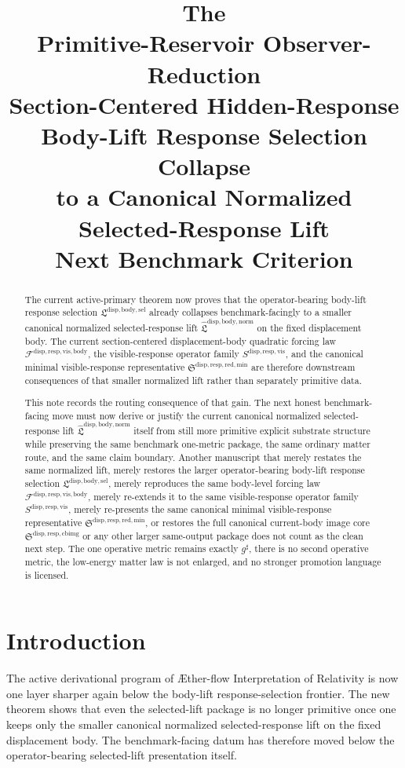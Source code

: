 \documentclass[11pt]{article}
\title{\textbf{The \TheoryName{}}\\[0.4em]
\large Primitive-Reservoir Observer-Reduction\\
\large Section-Centered Hidden-Response\\
\large Body-Lift Response Selection Collapse\\
\large to a Canonical Normalized\\
\large Selected-Response Lift\\
\large Next Benchmark Criterion}
\author{}
\date{}
\newcommand{\Aflow}{\AE{}ther-flow}
\newcommand{\TheoryName}{\Aflow{} Interpretation of Relativity}
\newcommand{\CompletedMetric}{g^{\sharp}}
\newcommand{\LiftSelectionPackage}{\mathfrak L^{\mathrm{disp,body,sel}}}
\newcommand{\NormalizedLiftPackage}{\widehat{\mathfrak L}^{\mathrm{disp,body,norm}}}
\newcommand{\VisibleBodyForcingLaw}{\mathscr F^{\mathrm{disp,resp,vis,body}}}
\newcommand{\VisibleResponseOperator}{S^{\mathrm{disp,resp,vis}}}
\newcommand{\MinimalReducedStructure}{\mathfrak S^{\mathrm{disp,resp,red,min}}}
\newcommand{\CurrentBodyImageCore}{\mathfrak S^{\mathrm{disp,resp,cbimg}}}
\begin{document}
\maketitle

\begin{abstract}
The current active-primary theorem now proves that the operator-bearing body-lift response selection \(\LiftSelectionPackage\) already collapses benchmark-facingly to a smaller canonical normalized selected-response lift \(\NormalizedLiftPackage\) on the fixed displacement body. The current section-centered displacement-body quadratic forcing law \(\VisibleBodyForcingLaw\), the visible-response operator family \(\VisibleResponseOperator\), and the canonical minimal visible-response representative \(\MinimalReducedStructure\) are therefore downstream consequences of that smaller normalized lift rather than separately primitive data.

This note records the routing consequence of that gain. The next honest benchmark-facing move must now derive or justify the current canonical normalized selected-response lift \(\NormalizedLiftPackage\) itself from still more primitive explicit substrate structure while preserving the same benchmark one-metric package, the same ordinary matter route, and the same claim boundary. Another manuscript that merely restates the same normalized lift, merely restores the larger operator-bearing body-lift response selection \(\LiftSelectionPackage\), merely reproduces the same body-level forcing law \(\VisibleBodyForcingLaw\), merely re-extends it to the same visible-response operator family \(\VisibleResponseOperator\), merely re-presents the same canonical minimal visible-response representative \(\MinimalReducedStructure\), or restores the full canonical current-body image core \(\CurrentBodyImageCore\) or any other larger same-output package does not count as the clean next step. The one operative metric remains exactly \(\CompletedMetric\), there is no second operative metric, the low-energy matter law is not enlarged, and no stronger promotion language is licensed.
\end{abstract}

\section{Introduction}

The active derivational program of \TheoryName{} is now one layer sharper again below the body-lift response-selection frontier. The new theorem shows that even the selected-lift package is no longer primitive once one keeps only the smaller canonical normalized selected-response lift on the fixed displacement body. The benchmark-facing datum has therefore moved below the operator-bearing selected-lift presentation itself.
\end{document}
